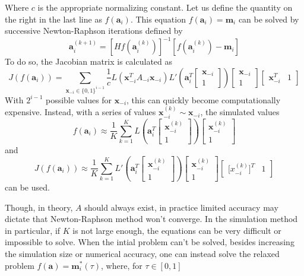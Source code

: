 \documentclass[11pt]{article}
\theoremstyle{definition}
\begin{document}
            Where $c$ is the appropriate normalizing constant. Let us define the quantity on the right in the last line as $f(\mathbf a_i)$. This equation $f(\mathbf a_i)=\mathbf{m}_i$ can be solved by successive Newton-Raphson iterations defined by 
            \[\mathbf a_i^{(k+1)} = \left[H f\left(\mathbf a_i^{(k)}\right)\right]^{-1}\left[f\left(\mathbf a_i^{(k)}\right)-\mathbf m_i\right] \]
            To do so, the Jacobian matrix is calculated as 
        \[ J\left( f\left(\mathbf a_i\right)\right) = \sum_{\mathbf x_{-i} \in \{0,1\}^{i-1}} \frac{1}{c}L \left(\mathbf x_{-i}^TA_{-i}\mathbf x_{-i}\right) L'\left(\mathbf{a}_i^T\left[\begin{array}{c} \mathbf x_{-i} \\ 1 \end{array}\right]\right)\left[\begin{array}{c} \mathbf x_{-i} \\ 1 \end{array}\right]\left[\begin{array}{cc} \mathbf x_{-i}^T & 1 \end{array}\right] \]
            With $2^{i-1}$ possible values for $\mathbf x_{-i}$, this can quickly become computationally expensive. Instead, with a series of values $\mathbf x_{-i}^{(k)}\sim \mathbf x_{-i}$, the simulated values 
            \[f\left(\mathbf a_i\right) \approx \frac{1}{K}\sum_{k=1}^K L\left(\mathbf{a}_i^T\left[\begin{array}{c} \mathbf x_{-i}^{(k)} \\ 1 \end{array}\right]\right)\left[\begin{array}{c} \mathbf x_{-i}^{(k)} \\ 1 \end{array}\right] \]
            and
            \[J\left( f\left(\mathbf a_i\right)\right) \approx \frac{1}{K}\sum_{k=1}^K L'\left(\mathbf{a}_i^T\left[\begin{array}{c} \mathbf x_{-i}^{(k)} \\ 1 \end{array}\right]\right)\left[\begin{array}{c} \mathbf x_{-i}^{(k)} \\ 1 \end{array}\right]\left[\begin{array}{cc} \mathbf [x_{-i}^{(k)}]^T & 1 \end{array}\right] \]
            can be used. \par
            Though, in theory, $A$ should always exist, in practice limited accuracy may dictate that Newton-Raphson method won't converge. In the simulation method in particular, if $K$ is not large enough, the equations can be very difficult or impossible to solve. When the intial problem can't be solved, besides increasing the simulation size or numerical accuracy, one can instead solve the relaxed problem  $f(\mathbf a)=\mathbf m_i^*(\tau)$, where, for $\tau\in[0,1]$
\end{document}
